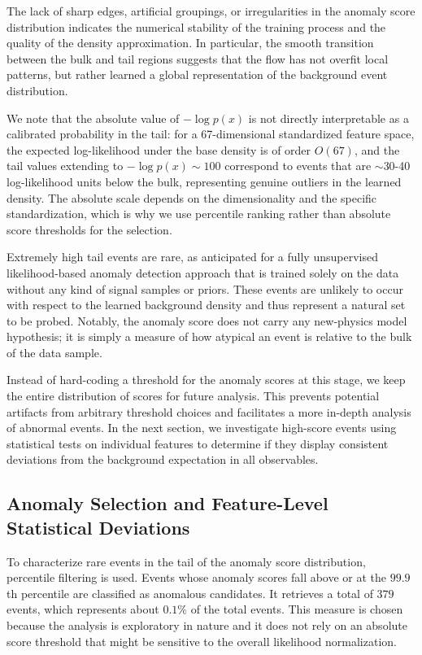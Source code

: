 \documentclass[11pt,a4paper,twocolumn]{article}
\begin{document}
The lack of sharp edges, artificial groupings, or irregularities in the anomaly score distribution indicates the numerical stability of the training process and the quality of the density approximation. In particular, the smooth transition between the bulk and tail regions suggests that the flow has not overfit local patterns, but rather learned a global representation of the background event distribution.

We note that the absolute value of $-\log p(x)$ is not directly interpretable as a calibrated probability in the tail: for a 67-dimensional standardized feature space, the expected log-likelihood under the base density is of order $O(67)$, and the tail values extending to $-\log p(x) \sim 100$ correspond to events that are $\sim$30-40 log-likelihood units below the bulk, representing genuine outliers in the learned density. The absolute scale depends on the dimensionality and the specific standardization, which is why we use percentile ranking rather than absolute score thresholds for the selection.

Extremely high tail events are rare, as anticipated for a fully unsupervised likelihood-based anomaly detection approach that is trained solely on the data without any kind of signal samples or priors. These events are unlikely to occur with respect to the learned background density and thus represent a natural set to be probed. Notably, the anomaly score does not carry any new-physics model hypothesis; it is simply a measure of how atypical an event is relative to the bulk of the data sample.

Instead of hard-coding a threshold for the anomaly scores at this stage, we keep the entire distribution of scores for future analysis. This prevents potential artifacts from arbitrary threshold choices and facilitates a more in-depth analysis of abnormal events. In the next section, we investigate high-score events using statistical tests on individual features to determine if they display consistent deviations from the background expectation in all observables.

\subsection{Anomaly Selection and Feature-Level Statistical Deviations}
\label{sec:anomaly_selection}

To characterize rare events in the tail of the anomaly score distribution, percentile filtering is used. Events whose anomaly scores fall above or at the $99.9$th percentile are classified as anomalous candidates. It retrieves a total of $379$ events, which represents about $0.1\%$ of the total events. This measure is chosen because the analysis is exploratory in nature and it does not rely on an absolute score threshold that might be sensitive to the overall likelihood normalization.
\end{document}
